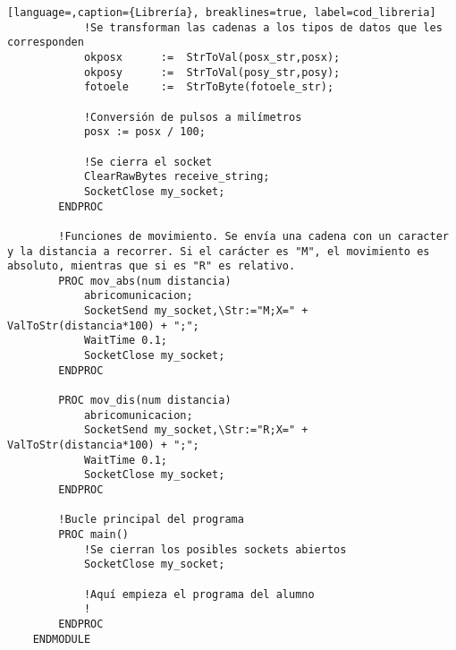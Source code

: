 \begin{lstlisting}[language=,caption={Librería}, breaklines=true, label=cod_libreria]
            !Se transforman las cadenas a los tipos de datos que les corresponden
            okposx      :=  StrToVal(posx_str,posx);
            okposy      :=  StrToVal(posy_str,posy);
            fotoele     :=  StrToByte(fotoele_str);
            
            !Conversión de pulsos a milímetros
            posx := posx / 100;
    
            !Se cierra el socket
            ClearRawBytes receive_string;
            SocketClose my_socket;
        ENDPROC
    
        !Funciones de movimiento. Se envía una cadena con un caracter y la distancia a recorrer. Si el carácter es "M", el movimiento es absoluto, mientras que si es "R" es relativo.
        PROC mov_abs(num distancia)
            abricomunicacion;
            SocketSend my_socket,\Str:="M;X=" + ValToStr(distancia*100) + ";";
            WaitTime 0.1;
            SocketClose my_socket;
        ENDPROC
        
        PROC mov_dis(num distancia)
            abricomunicacion;
            SocketSend my_socket,\Str:="R;X=" + ValToStr(distancia*100) + ";";
            WaitTime 0.1;
            SocketClose my_socket;
        ENDPROC

        !Bucle principal del programa
        PROC main()
            !Se cierran los posibles sockets abiertos
            SocketClose my_socket;
            
            !Aquí empieza el programa del alumno
            !
        ENDPROC
    ENDMODULE
\end{lstlisting}
